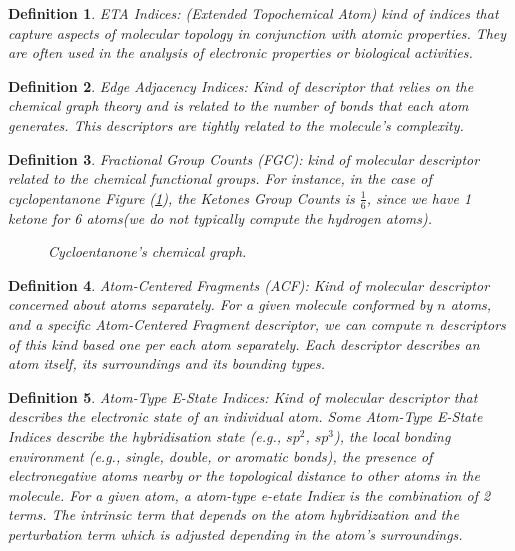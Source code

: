 \documentclass[12pt,letterpaper]{article}
\newtheorem{definition}{Definition}
\begin{document}
\begin{multicols}{2}
\begin{definition}
ETA Indices: (Extended Topochemical Atom) kind of indices that capture aspects of molecular topology in conjunction with atomic properties. They are often used in the analysis of electronic properties or biological activities.\cite{DescriptorsBook}
\end{definition}

\begin{definition}
Edge Adjacency Indices: Kind of descriptor that relies on the chemical graph theory and is related to the number of bonds that each atom generates. This descriptors are tightly related to the molecule's complexity.\cite{DescriptorsBook}
\end{definition}

\begin{definition}
Fractional Group Counts (FGC): kind of molecular descriptor related to the chemical functional groups. For instance, in the case of cyclopentanone Figure (\ref{figurenCiclopentanone}), the Ketones Group Counts  is $\frac{1}{6}$, since we have 1 ketone for 6 atoms(we do not typically compute the hydrogen atoms).\cite{DescriptorsBook}
\begin{figure}[H]
\centering
{}\hspace{1cm}
\caption{Cycloentanone's chemical graph.}
\label{figurenCiclopentanone}
\end{figure}
\end{definition}

\begin{definition}
Atom-Centered Fragments (ACF): Kind of molecular descriptor concerned about atoms separately. For a given molecule conformed by $n$ atoms, and a specific Atom-Centered Fragment descriptor, we can compute $n$ descriptors of this kind based one per each atom separately. Each descriptor describes an atom itself, its surroundings and its bounding types.\cite{DescriptorsBook}
\end{definition}

\begin{definition}
Atom-Type E-State Indices: Kind of molecular descriptor that describes the electronic state of an individual atom. Some Atom-Type E-State Indices describe the hybridisation state (e.g., $sp^2$, $sp^3$), the local bonding environment (e.g., single, double, or aromatic bonds), the presence of electronegative atoms nearby or the topological distance to other atoms in the molecule. For a given atom, a atom-type e-etate Indiex is the combination of 2 terms. The intrinsic term that depends on the atom hybridization and the perturbation term which is adjusted depending in the atom's surroundings.\cite{DescriptorsBook}
\end{definition}


\end{multicols}
\end{document}
